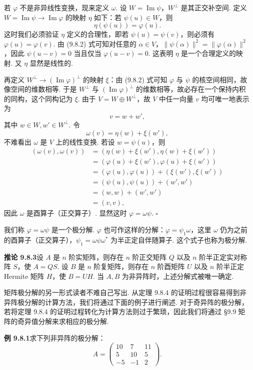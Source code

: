 \documentclass[UTF8, 12pt, fontset=fandol, oneside]{ctexart}
\begin{document}
若 $\varphi$ 不是非异线性变换，现来定义 $\omega$. 设 $W=\operatorname{Im}\psi$，$W^\perp$ 是其正交补空间. 定义 $W=\operatorname{Im}\psi\to\operatorname{Im}\varphi$ 的映射 $\eta$ 如下：若 $\psi(u)\in W$，则
\[
  \eta(\psi(u))=\varphi(u).
\]
这时我们必须验证 $\eta$ 定义的合理性，即若 $\psi(u)=\psi(v)$，则必须有 $\varphi(u)=\varphi(v)$. 由 (9.8.2) 式可知对任意的 $\alpha\in V$，$\|\psi(\alpha)\|^2=\|\varphi(\alpha)\|^2$，因此 $\psi(u-v)=0$ 当且仅当 $\varphi(u-v)=0$. 这表明 $\eta$ 是一个合理定义的映射. 又 $\eta$ 显然是线性的.

再定义 $W^\perp\to(\operatorname{Im}\varphi)^\perp$ 的映射 $\xi$：由 (9.8.2) 式可知 $\varphi$ 与 $\psi$ 的核空间相同，故像空间的维数相等. 于是 $W^\perp$ 与 $(\operatorname{Im}\varphi)^\perp$ 的维数相等，故必存在一个保持内积的同构，这个同构记为 $\xi$. 由于 $V=W\oplus W^\perp$，故 $V$ 中任一向量 $v$ 均可唯一地表示为
\[
  v=w+w',
\]
其中 $w\in W,w'\in W^\perp$. 令
\[
  \omega(v)=\eta(w)+\xi(w'),
\]
不难看出 $\omega$ 是 $V$ 上的线性变换. 若设 $w=\psi(u)$，则
\[
\begin{aligned}
  (\omega(v),\omega(v))
  &= (\eta(w)+\xi(w'),\eta(w)+\xi(w'))\\
  &= (\varphi(u)+\xi(w'),\varphi(u)+\xi(w'))\\
  &= (\varphi(u),\varphi(u))+(\xi(w'),\xi(w'))\\
  &= (\psi(u),\psi(u))+(w',w')\\
  &= (w,w)+(w',w')\\
  &= (v,v),
\end{aligned}
\]
因此 $\omega$ 是酉算子（正交算子）. 显然这时 $\varphi=\omega\psi$. $\square$

我们称 $\varphi=\omega\psi$ 是一个极分解. $\varphi$ 也可作这样的分解：$\varphi=\psi_1\omega$，这里 $\omega$ 仍为之前的酉算子（正交算子），$\psi_1=\omega\psi\omega^*$ 为半正定自伴随算子. 这个式子也称为极分解.

\noindent\textbf{推论 9.8.3}\quad 设 $A$ 是 $n$ 阶实矩阵，则存在 $n$ 阶正交矩阵 $Q$ 以及 $n$ 阶半正定实对称阵 $S$，使 $A=QS$. 设 $B$ 是 $n$ 阶复矩阵，则存在 $n$ 阶酉矩阵 $U$ 以及 $n$ 阶半正定 Hermite 矩阵 $H$，使 $B=UH$. 当 $A,B$ 为非异阵时，上述分解式被唯一确定.

矩阵极分解的另一形式读者不难自己写出. 从定理 9.8.4 的证明过程很容易得到非异阵极分解的计算方法，我们将通过下面的例子进行阐述. 对于奇异阵的极分解，若将定理 9.8.4 的证明过程转化为计算方法则过于繁琐，因此我们将通过 §9.9 矩阵的奇异值分解来求相应的极分解.

\noindent\textbf{例 9.8.1}\quad 求下列非异阵的极分解：
\[
  A=
  \left(\begin{array}{rrr}
    10 & 7 & 11\\
    5 & 10 & 5\\
    -5 & -1 & 2
  \end{array}\right).
\]
\end{document}
